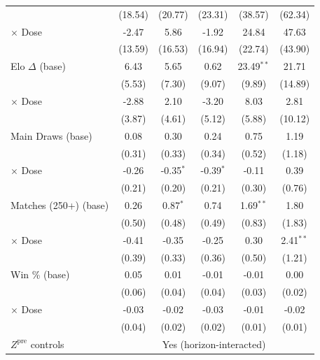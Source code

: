 \begin{tabular}{lccccc}
 & (18.54) & (20.77) & (23.31) & (38.57) & (62.34) \\
\quad \quad $\times$ Dose & -2.47 & 5.86 & -1.92 & 24.84 & 47.63 \\
 & (13.59) & (16.53) & (16.94) & (22.74) & (43.90) \\[0.3em]
\quad Elo $\Delta$ (base) & 6.43 & 5.65 & 0.62 & 23.49$^{**}$ & 21.71 \\
 & (5.53) & (7.30) & (9.07) & (9.89) & (14.89) \\
\quad \quad $\times$ Dose & -2.88 & 2.10 & -3.20 & 8.03 & 2.81 \\
 & (3.87) & (4.61) & (5.12) & (5.88) & (10.12) \\[0.3em]
\quad Main Draws (base) & 0.08 & 0.30 & 0.24 & 0.75 & 1.19 \\
 & (0.31) & (0.33) & (0.34) & (0.52) & (1.18) \\
\quad \quad $\times$ Dose & -0.26 & -0.35$^{*}$ & -0.39$^{*}$ & -0.11 & 0.39 \\
 & (0.21) & (0.20) & (0.21) & (0.30) & (0.76) \\[0.3em]
\quad Matches (250+) (base) & 0.26 & 0.87$^{*}$ & 0.74 & 1.69$^{**}$ & 1.80 \\
 & (0.50) & (0.48) & (0.49) & (0.83) & (1.83) \\
\quad \quad $\times$ Dose & -0.41 & -0.35 & -0.25 & 0.30 & 2.41$^{**}$ \\
 & (0.39) & (0.33) & (0.36) & (0.50) & (1.21) \\[0.3em]
\quad Win \% (base) & 0.05 & 0.01 & -0.01 & -0.01 & 0.00 \\
 & (0.06) & (0.04) & (0.04) & (0.03) & (0.02) \\
\quad \quad $\times$ Dose & -0.03 & -0.02 & -0.03 & -0.01 & -0.02 \\
 & (0.04) & (0.02) & (0.02) & (0.01) & (0.01) \\[0.3em]
\midrule
$Z^{\text{pre}}$ controls & \multicolumn{5}{c}{Yes (horizon-interacted)} \\
\bottomrule
\end{tabular}
